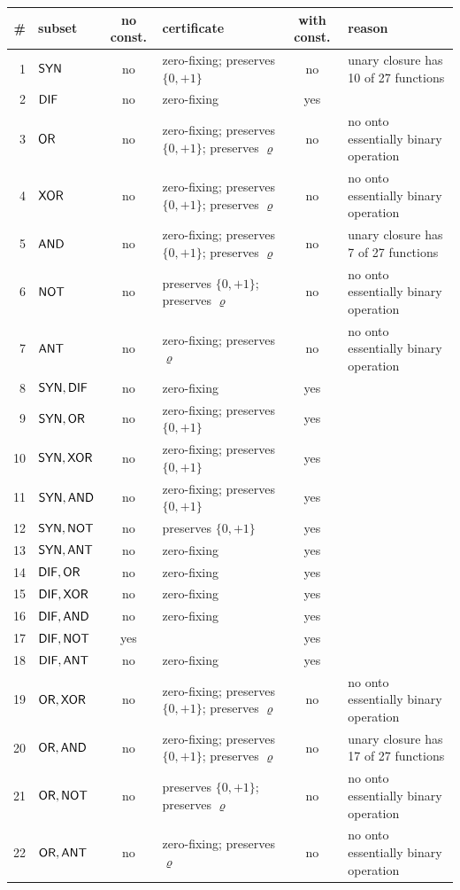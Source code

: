 \documentclass[10pt,a4paper]{article}
\begin{document}
\begin{center}\scriptsize\begin{longtable}{rlcp{3.9cm}cp{3.9cm}}
\toprule \#&subset&no const.&certificate&with const.&reason\\\midrule\endhead
1&$\mathsf{SYN}$&no&zero-fixing; preserves $\{0,+1\}$&no&unary closure has 10 of 27 functions\\
2&$\mathsf{DIF}$&no&zero-fixing&yes&\\
3&$\mathsf{OR}$&no&zero-fixing; preserves $\{0,+1\}$; preserves $\varrho$&no&no onto essentially binary operation\\
4&$\mathsf{XOR}$&no&zero-fixing; preserves $\{0,+1\}$; preserves $\varrho$&no&no onto essentially binary operation\\
5&$\mathsf{AND}$&no&zero-fixing; preserves $\{0,+1\}$; preserves $\varrho$&no&unary closure has 7 of 27 functions\\
6&$\mathsf{NOT}$&no&preserves $\{0,+1\}$; preserves $\varrho$&no&no onto essentially binary operation\\
7&$\mathsf{ANT}$&no&zero-fixing; preserves $\varrho$&no&no onto essentially binary operation\\
8&$\mathsf{SYN}, \mathsf{DIF}$&no&zero-fixing&yes&\\
9&$\mathsf{SYN}, \mathsf{OR}$&no&zero-fixing; preserves $\{0,+1\}$&yes&\\
10&$\mathsf{SYN}, \mathsf{XOR}$&no&zero-fixing; preserves $\{0,+1\}$&yes&\\
11&$\mathsf{SYN}, \mathsf{AND}$&no&zero-fixing; preserves $\{0,+1\}$&yes&\\
12&$\mathsf{SYN}, \mathsf{NOT}$&no&preserves $\{0,+1\}$&yes&\\
13&$\mathsf{SYN}, \mathsf{ANT}$&no&zero-fixing&yes&\\
14&$\mathsf{DIF}, \mathsf{OR}$&no&zero-fixing&yes&\\
15&$\mathsf{DIF}, \mathsf{XOR}$&no&zero-fixing&yes&\\
16&$\mathsf{DIF}, \mathsf{AND}$&no&zero-fixing&yes&\\
17&$\mathsf{DIF}, \mathsf{NOT}$&yes&&yes&\\
18&$\mathsf{DIF}, \mathsf{ANT}$&no&zero-fixing&yes&\\
19&$\mathsf{OR}, \mathsf{XOR}$&no&zero-fixing; preserves $\{0,+1\}$; preserves $\varrho$&no&no onto essentially binary operation\\
20&$\mathsf{OR}, \mathsf{AND}$&no&zero-fixing; preserves $\{0,+1\}$; preserves $\varrho$&no&unary closure has 17 of 27 functions\\
21&$\mathsf{OR}, \mathsf{NOT}$&no&preserves $\{0,+1\}$; preserves $\varrho$&no&no onto essentially binary operation\\
22&$\mathsf{OR}, \mathsf{ANT}$&no&zero-fixing; preserves $\varrho$&no&no onto essentially binary operation\\

\end{longtable}
\end{center}
\end{document}
